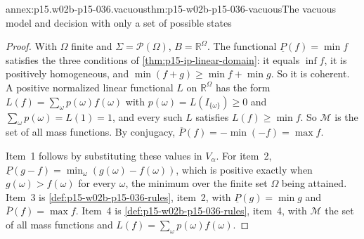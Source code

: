 \begin{annexitem}{annex:p15.w02b-p15-036.vacuous}{thm:p15-w02b-p15-036-vacuous}{The vacuous model and decision with only a set of possible states}
\begin{proof}
With \(\Omega\) finite and \(\Sigma=\mathcal P(\Omega)\), \(B=\mathbb
R^\Omega\). The functional \(\underline P(f)=\min f\) satisfies the three
conditions of \cref{thm:p15-ip-linear-domain}: it equals \(\inf f\), it is
positively homogeneous, and \(\min(f+g)\geq\min f+\min g\). So it is
coherent. A positive normalized linear functional \(L\) on
\(\mathbb R^\Omega\) has the form \(L(f)=\sum_\omega p(\omega)f(\omega)\)
with \(p(\omega)=L(I_{\{\omega\}})\geq0\) and \(\sum_\omega p(\omega)=
L(1)=1\), and every such \(L\) satisfies \(L(f)\geq\min f\). So
\(\mathcal M\) is the set of all mass functions. By conjugacy,
\(\overline P(f)=-\min(-f)=\max f\).

Item~1 follows by substituting these values in \(V_\alpha\). For item~2,
\(\underline P(g-f)=\min_\omega(g(\omega)-f(\omega))\), which is positive
exactly when \(g(\omega)>f(\omega)\) for every \(\omega\), the minimum over
the finite set \(\Omega\) being attained. Item~3 is
\cref{def:p15-w02b-p15-036-rules}, item~2, with
\(\underline P(g)=\min g\) and \(\overline P(f)=\max f\). Item~4 is
\cref{def:p15-w02b-p15-036-rules}, item~4, with \(\mathcal M\) the set of
all mass functions and \(L(f)=\sum_\omega p(\omega)f(\omega)\).
\end{proof}
\end{annexitem}

